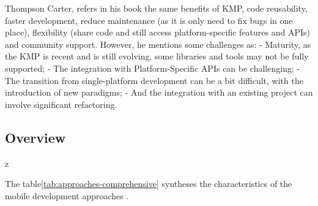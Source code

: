 Thompson Carter, refers in his book\cite{kotlinInDepth} the same benefits of KMP, code reusability, faster development, reduce maintenance (as it is only need to fix bugs in one place), flexibility (share code and still access platform-specific features and APIs) and community support.
However, he mentions some challenges as:
- Maturity, as the KMP is recent and is still evolving, some libraries and tools may not be fully supported;
- The integration with Platform-Specific APIs can be challenging;
- The transition from single-platform development can be a bit difficult, with the introduction of new paradigms;
- And the integration with an existing project can involve significant refactoring.




\subsection{Overview}\label{subsec:overview}



z

The table\ref{tab:approaches-comprehensive} syntheses the characteristics of the mobile development approaches .


\renewcommand{\arraystretch}{1.2}
\setlength{\tabcolsep}{8pt}

